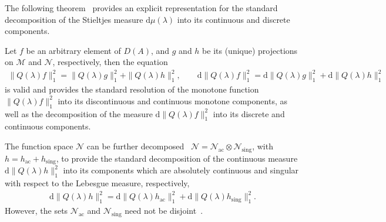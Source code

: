 \documentclass[leqno,onefignum,onetabnum]{siamltex1213}
\renewcommand{\d}{\mathrm{d}}
\newcommand{\Mc}{\mathcal{M}}
\newcommand{\Nc}{\mathcal{N}}
\begin{document}
The following theorem~\cite{Stone:64} provides an explicit
representation for the standard decomposition of the Stieltjes measure
$\d\mu(\lambda)$ into its continuous and discrete components.
%
\begin{theorem}
Let $f$ be an arbitrary element of $D(A)$, and $g$ and $h$ be its (unique)
projections on $\Mc$ and $\Nc$, respectively, then the equation
%
\begin{align}
  \|Q(\lambda)f\|_1^2=\|Q(\lambda)g\|_1^2+\|Q(\lambda)h\|_1^2, \qquad
  \d\|Q(\lambda)f\|_1^2=\d\|Q(\lambda)g\|_1^2+\d\|Q(\lambda)h\|_1^2
\end{align}
%
is valid and provides the standard resolution of the monotone function
$\|Q(\lambda)f\|_1^2$ into its discontinuous and continuous monotone
components, as well as the decomposition of the measure
$\d\|Q(\lambda)f\|_1^2$ into its discrete and continuous components.  
\end{theorem}
%
\noindent
The function space $\Nc$ can be further decomposed~\cite{Reed-1980}
$\Nc=\Nc_{\text{ac}}\otimes\Nc_{\text{sing}}$, with
$h=h_{\text{ac}}+h_{\text{sing}}$, to provide the standard
\cite{Folland:99} decomposition of the continuous measure
$\d\|Q(\lambda)h\|_1^2$ into its components which are absolutely continuous
and singular with respect to the Lebesgue measure, respectively,
%
\begin{align}
  \d\|Q(\lambda)h\|_1^2=\d\|Q(\lambda)h_{\text{ac}}\|_1^2+\d\|Q(\lambda)h_{\text{sing}}\|_1^2.
\end{align}
%
However, the sets $\Nc_{\text{ac}}$ and $\Nc_{\text{sing}}$ need not
be disjoint~\cite{Reed-1980}. 
\end{document}
